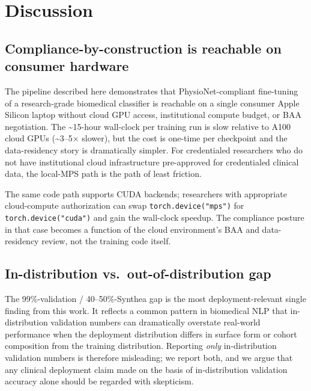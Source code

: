 \section{Discussion}\label{discussion}

\subsection{Compliance-by-construction is reachable on consumer hardware}\label{compliance-by-construction-is-reachable-on-consumer-hardware}

The pipeline described here demonstrates that PhysioNet-compliant
fine-tuning of a research-grade biomedical classifier is reachable
on a single consumer Apple Silicon laptop without cloud GPU
access, institutional compute budget, or BAA negotiation. The
\textasciitilde15-hour wall-clock per training run is slow relative to A100
cloud GPUs (\textasciitilde3--5× slower), but the cost is one-time per
checkpoint and the data-residency story is dramatically simpler.
For credentialed researchers who do not have institutional cloud
infrastructure pre-approved for credentialed clinical data, the
local-MPS path is the path of least friction.

The same code path supports CUDA backends; researchers with
appropriate cloud-compute authorization can swap
\texttt{torch.device("mps")} for \texttt{torch.device("cuda")} and gain the
wall-clock speedup. The compliance posture in that case becomes a
function of the cloud environment's BAA and data-residency
review, not the training code itself.

\subsection{In-distribution vs.~out-of-distribution gap}\label{in-distribution-vs.-out-of-distribution-gap}

The 99\%-validation / 40--50\%-Synthea gap is the most
deployment-relevant single finding from this work. It reflects a
common pattern in biomedical NLP that in-distribution validation
numbers can dramatically overstate real-world performance when
the deployment distribution differs in surface form or cohort
composition from the training distribution. Reporting \emph{only}
in-distribution validation numbers is therefore misleading; we
report both, and we argue that any clinical deployment claim made
on the basis of in-distribution validation accuracy alone should
be regarded with skepticism.

